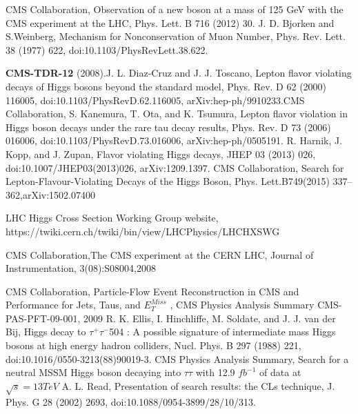 \documentclass[a4paper,11pt]{article}
\begin{document}
\begin{thebibliography}{}

CMS Collaboration, Observation of a new boson at a mass of 125 GeV with the CMS experiment at the LHC, Phys. Lett. B 716 (2012) 30.
J. D. Bjorken and S.Weinberg, Mechanism for Nonconservation of Muon Number, Phys. Rev. Lett. 38 (1977) 622, doi:10.1103/PhysRevLett.38.622.

 {\bf CMS-TDR-12} (2008).J. L. Diaz-Cruz and J. J. Toscano, Lepton flavor violating decays of Higgs bosons beyond the standard model, Phys. Rev. D 62 (2000) 116005, doi:10.1103/PhysRevD.62.116005, arXiv:hep-ph/9910233.CMS Collaboration,
S. Kanemura, T. Ota, and K. Tsumura, Lepton flavor violation in Higgs boson decays under the rare tau decay results, Phys. Rev. D 73 (2006) 016006, doi:10.1103/PhysRevD.73.016006, arXiv:hep-ph/0505191.
R. Harnik, J. Kopp, and J. Zupan, Flavor violating Higgs decays, JHEP 03 (2013) 026, doi:10.1007/JHEP03(2013)026, arXiv:1209.1397.
CMS Collaboration, Search for Lepton-Flavour-Violating Decays of the Higgs Boson, Phys. Lett.B749(2015) 337–362,arXiv:1502.07400 

LHC Higgs Cross Section Working Group website, https://twiki.cern.ch/twiki/bin/view/LHCPhysics/LHCHXSWG

CMS Collaboration,The CMS experiment at the CERN LHC, Journal of Instrumentation, 3(08):S08004,2008
  
CMS Collaboration, Particle-Flow Event Reconstruction in CMS and Performance for Jets, Taus, and $E_{T}^{Miss}$ , CMS Physics Analysis Summary CMS-PAS-PFT-09-001, 2009
R. K. Ellis, I. Hinchliffe, M. Soldate, and J. J. van der Bij, Higgs decay to $\tau^{+}\tau^{-}$504 : A possible signature of intermediate mass Higgs bosons at high energy hadron colliders, Nucl. Phys. B 297 (1988) 221, doi:10.1016/0550-3213(88)90019-3.
 CMS Physics Analysis Summary, Search for a neutral MSSM Higgs boson decaying into $\tau\tau$ with 12.9 $fb^{-1}$ of data at $\sqrt{s}=13 TeV$
 A. L. Read, Presentation of search results: the CLs technique, J. Phys. G 28 (2002) 2693, doi:10.1088/0954-3899/28/10/313.




\end{thebibliography}
\end{document}
